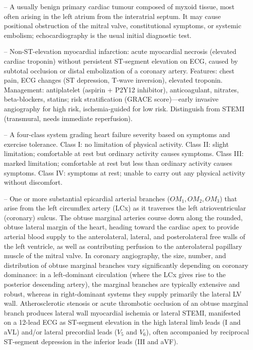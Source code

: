 -- A usually benign primary cardiac tumour composed of myxoid tissue, most often arising in the left atrium from the interatrial septum. It may cause positional obstruction of the mitral valve, constitutional symptoms, or systemic embolism; echocardiography is the usual initial diagnostic test.

-- Non-ST-elevation myocardial infarction: acute myocardial necrosis (elevated cardiac troponin) without persistent ST-segment elevation on ECG, caused by subtotal occlusion or distal embolization of a coronary artery. Features: chest pain, ECG changes (ST depression, T-wave inversion), elevated troponin. Management: antiplatelet (aspirin + P2Y12 inhibitor), anticoagulant, nitrates, beta-blockers, statins; risk stratification (GRACE score)—early invasive angiography for high risk, ischemia-guided for low risk. Distinguish from STEMI (transmural, needs immediate reperfusion).

-- A four-class system grading heart failure severity based on symptoms and exercise tolerance. Class I: no limitation of physical activity. Class II: slight limitation; comfortable at rest but ordinary activity causes symptoms. Class III: marked limitation; comfortable at rest but less than ordinary activity causes symptoms. Class IV: symptoms at rest; unable to carry out any physical activity without discomfort.

-- One or more substantial epicardial arterial branches ($OM_1, OM_2, OM_3$) that arise from the left circumflex artery (LCx) as it traverses the left atrioventricular (coronary) sulcus. The obtuse marginal arteries course down along the rounded, obtuse lateral margin of the heart, heading toward the cardiac apex to provide arterial blood supply to the anterolateral, lateral, and posterolateral free walls of the left ventricle, as well as contributing perfusion to the anterolateral papillary muscle of the mitral valve. In coronary angiography, the size, number, and distribution of obtuse marginal branches vary significantly depending on coronary dominance: in a left-dominant circulation (where the LCx gives rise to the posterior descending artery), the marginal branches are typically extensive and robust, whereas in right-dominant systems they supply primarily the lateral LV wall. Atherosclerotic stenosis or acute thrombotic occlusion of an obtuse marginal branch produces lateral wall myocardial ischemia or lateral STEMI, manifested on a 12-lead ECG as ST-segment elevation in the high lateral limb leads (I and aVL) and/or lateral precordial leads ($V_5$ and $V_6$), often accompanied by reciprocal ST-segment depression in the inferior leads (III and aVF).

